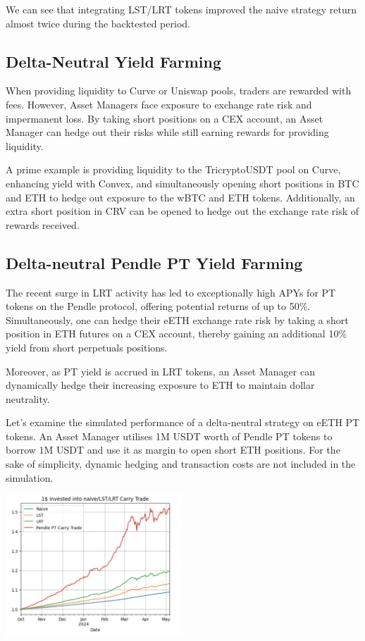 \documentclass[conference]{IEEEtran}
\begin{document}
We can see that integrating LST/LRT tokens improved the naive strategy return almost twice during the backtested period. 

\subsection{Delta-Neutral Yield Farming}

When providing liquidity to Curve or Uniswap pools, traders are rewarded with fees. However, Asset Managers face exposure to exchange rate risk and impermanent loss. By taking short positions on a CEX account, an Asset Manager can hedge out their risks while still earning rewards for providing liquidity.

A prime example is providing liquidity to the TricryptoUSDT pool on Curve, enhancing yield with Convex, and simultaneously opening short positions in BTC and ETH to hedge out exposure to the wBTC and ETH tokens. Additionally, an extra short position in CRV can be opened to hedge out the exchange rate risk of rewards received.

\subsection{Delta-neutral Pendle PT Yield Farming}

The recent surge in LRT activity has led to exceptionally high APYs for PT tokens on the Pendle protocol, offering potential returns of up to 50$\%$. Simultaneously, one can hedge their eETH exchange rate risk by taking a short position in ETH futures on a CEX account, thereby gaining an additional 10$\%$ yield from short perpetuals positions.

Moreover, as PT yield is accrued in LRT tokens, an Asset Manager can dynamically hedge their increasing exposure to ETH to maintain dollar neutrality.

Let’s examine the simulated performance of a delta-neutral strategy on eETH PT tokens. An Asset Manager utilises 1M USDT worth of Pendle PT tokens to borrow 1M USDT and use it as margin to open short ETH positions. For the sake of simplicity, dynamic hedging and transaction costs are not included in the simulation. 


{
\centering
\includegraphics[width=0.5\textwidth]{images/pendle_theoretical.png}
}
\end{document}
